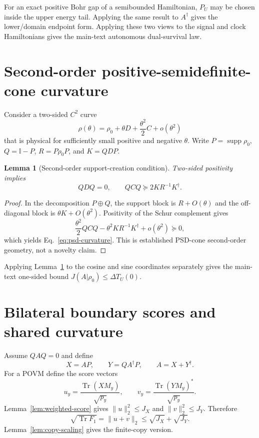 \documentclass[aps,pra,preprint,nofootinbib]{revtex4-2}
\newtheorem{lemma}{Lemma}
\newcommand{\Tr}{\operatorname{Tr}}
\newcommand{\supp}{\operatorname{supp}}
\newcommand{\id}{\mathbb I}
\newcommand{\rhozero}{\rho_0}
\begin{document}
For an exact positive Bohr gap of a semibounded Hamiltonian, $P_U$ may be chosen inside the upper energy tail. Applying the same result to $A^\dagger$ gives the lower/domain endpoint form. Applying these two views to the signal and clock Hamiltonians gives the main-text autonomous dual-survival law.

\section{Second-order positive-semidefinite-cone curvature}
\label{supp:psd}

Consider a two-sided $C^2$ curve
\begin{equation}
\rho(\theta)=\rhozero+\theta D+\frac{\theta^2}{2}C+o(\theta^2)
\end{equation}
that is physical for sufficiently small positive and negative $\theta$. Write $P=\supp\rhozero$, $Q=\id-P$, $R=P\rhozero P$, and $K=QDP$.

\begin{lemma}[Second-order support-creation condition]
\label{lem:psd-curvature}
Two-sided positivity implies
\begin{equation}
QDQ=0,
\qquad
QCQ\succeq2KR^{-1}K^\dagger.
\label{eq:psd-curvature}
\end{equation}
\end{lemma}

\begin{proof}
In the decomposition $P\oplus Q$, the support block is $R+O(\theta)$ and the off-diagonal block is $\theta K+O(\theta^2)$. Positivity of the Schur complement gives
\begin{equation}
\frac{\theta^2}{2}QCQ-\theta^2KR^{-1}K^\dagger+o(\theta^2)\succeq0,
\end{equation}
which yields Eq.~\eqref{eq:psd-curvature}. This is established PSD-cone second-order geometry, not a novelty claim.
\end{proof}

Applying Lemma~\ref{lem:psd-curvature} to the cosine and sine coordinates separately gives the main-text one-sided bound $J(A|\rhozero)\le\Delta T_U(0)$.

\section{Bilateral boundary scores and shared curvature}
\label{supp:bilateral}

Assume $QAQ=0$ and define
\begin{equation}
X=AP,
\qquad
Y=QA^\dagger P,
\qquad
A=X+Y^\dagger.
\end{equation}
For a POVM define the score vectors
\begin{equation}
u_y=\frac{\Tr(XM_y)}{\sqrt{p_y}},\qquad
v_y=\frac{\Tr(YM_y)^*}{\sqrt{p_y}}.
\end{equation}
Lemma~\ref{lem:weighted-score} gives $\|u\|_2^2\le J_X$ and $\|v\|_2^2\le J_Y$. Therefore
\begin{equation}
\sqrt{\Tr F_1}=\|u+v\|_2\le\sqrt{J_X}+\sqrt{J_Y}.
\end{equation}
Lemma~\ref{lem:copy-scaling} gives the finite-copy version.
\end{document}
